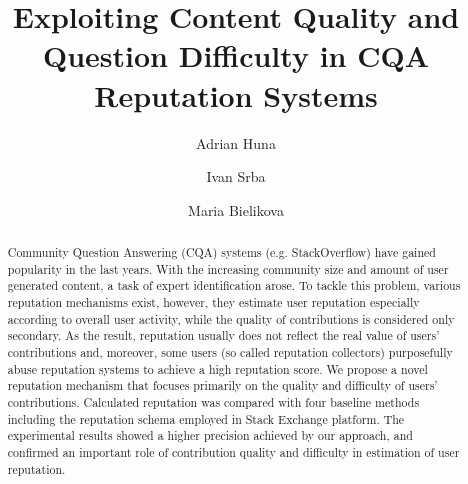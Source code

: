 \documentclass{llncs}
\begin{document}
	\title{Exploiting Content Quality and Question Difficulty in CQA Reputation Systems}
	\author{Adrian Huna \and Ivan Srba \and  Maria Bielikova}
	
\maketitle

	\begin{abstract}
	Community Question Answering (CQA) systems (e.g. StackOverflow)
	have gained popularity in the last years. With the increasing
	community size and amount of user generated content, a task of expert
	identification arose. To tackle this problem, various reputation mechanisms
	exist, however, they estimate user reputation especially according
	to overall user activity, while the quality of contributions is considered
	only secondary. As the result, reputation usually does not reflect the
	real value of users’ contributions and, moreover, some users (so called
	reputation collectors) purposefully abuse reputation systems to achieve
	a high reputation score. We propose a novel reputation mechanism that
	focuses primarily on the quality and difficulty of users’ contributions.
	Calculated reputation was compared with four baseline methods including
	the reputation schema employed in Stack Exchange platform. The
	experimental results showed a higher precision achieved by our approach,
	and confirmed an important role of contribution quality and difficulty in
	estimation of user reputation.\\


	\end{abstract}
	
\end{document}
